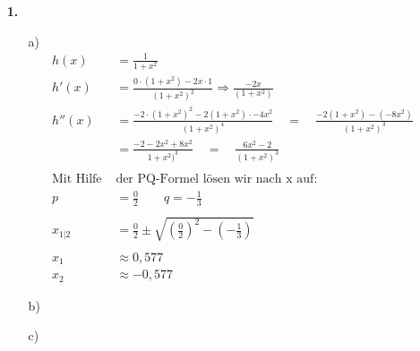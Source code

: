 \documentclass[a4paper,11pt]{article}
\title{\titleinfo}
\author{\authorinfotitle}
\date{\today}
\begin{document}
\maketitle
    \begin{enumerate}
        \item[\textbf{1.}]
        \begin{enumerate}
            \item[a)]
                \begin{align*}
                h(x) &= \frac{1}{1+x^2} \\
                h'(x) &= \frac{0 \cdot (1+x^2)-2x \cdot 1}{(1+x^2)^2} \Rightarrow \frac{-2x}{(1+x^2)} \\
                h''(x) &= \frac{-2 \cdot(1+x^2)^2 - 2(1+x^2) \cdot -4x^2}{(1+x^2)^4} \quad = \quad \frac{-2(1+x^2)-(-8x^2)}{(1+x^2)^3} \\
                &= \frac{-2 -2x^2 + 8x^2}{1+x^2)^3} \quad = \quad \frac{6x^2-2}{(1+x^2)^3}\\ \\
                \text{Mit Hilfe }& \text{der PQ-Formel lösen wir nach x auf:} \\
                p &= \frac{0}{2} \qquad q = -\frac{1}{3} \\ \\
                x_{1|2} &= \frac{0}{2} \pm \sqrt{\left(\frac{0}{2}\right)^2 -(-\frac{1}{3})} \\ \\
                x_1 &\approx 0,577 \\
                x_2 &\approx - 0,577 
                \end{align*}

            \item[b)]

            \item[c)]


\end{enumerate}
\end{enumerate}
\end{document}
